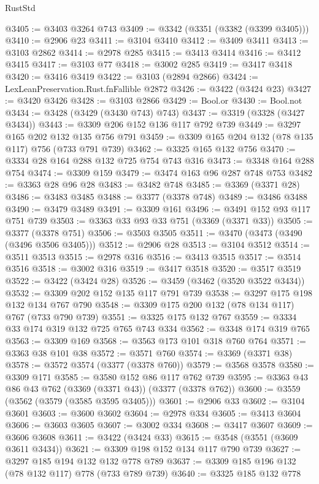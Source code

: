 \begin{lexlean}{RustStd}
\begin{coremodule}
@3405 := @3403 @3264 @743
@3409 := @3342 (@3351 (@3382 (@3399 @3405)))
@3410 := @2906 @23
@3411 := @3104 @3410
@3412 := @3409 @3411
@3413 := @3103 @2862
@3414 := @2978 @285
@3415 := @3413 @3414
@3416 := @3412 @3415
@3417 := @3103 @77
@3418 := @3002 @285
@3419 := @3417 @3418
@3420 := @3416 @3419
@3422 := @3103 (@2894 @2866)
@3424 := LexLeanPreservation.Rust.fnFallible @2872
@3426 := @3422 (@3424 @23)
@3427 := @3420 @3426
@3428 := @3103 @2866
@3429 := Bool.or
@3430 := Bool.not
@3434 := @3428 (@3429 (@3430 @743) @743)
@3437 := @3319 (@3328 (@3427 @3434))
@3443 := @3309 @206 @152 @136 @117 @792 @739
@3449 := @3297 @165 @202 @132 @135 @756 @791
@3459 := @3309 @165 @204 @132 (@78 @135 @117) @756 (@733 @791 @739)
@3462 := @3325 @165 @132 @756
@3470 := @3334 @28 @164 @288 @132 @725 @754 @743 @316
@3473 := @3348 @164 @288 @754
@3474 := @3309 @159
@3479 := @3474 @163 @96 @287 @748 @753
@3482 := @3363 @28 @96 @28
@3483 := @3482 @748
@3485 := @3369 (@3371 @28)
@3486 := @3483 @3485
@3488 := @3377 (@3378 @748)
@3489 := @3486 @3488
@3490 := @3479 @3489
@3491 := @3309 @161
@3496 := @3491 @152 @93 @117 @751 @739
@3503 := @3363 @33 @93 @33 @751 (@3369 (@3371 @33))
@3505 := @3377 (@3378 @751)
@3506 := @3503 @3505
@3511 := @3470 (@3473 (@3490 (@3496 @3506 @3405)))
@3512 := @2906 @28
@3513 := @3104 @3512
@3514 := @3511 @3513
@3515 := @2978 @316
@3516 := @3413 @3515
@3517 := @3514 @3516
@3518 := @3002 @316
@3519 := @3417 @3518
@3520 := @3517 @3519
@3522 := @3422 (@3424 @28)
@3526 := @3459 (@3462 (@3520 @3522 @3434))
@3532 := @3309 @202 @152 @135 @117 @791 @739
@3538 := @3297 @175 @198 @132 @134 @767 @790
@3548 := @3309 @175 @200 @132 (@78 @134 @117) @767 (@733 @790 @739)
@3551 := @3325 @175 @132 @767
@3559 := @3334 @33 @174 @319 @132 @725 @765 @743 @334
@3562 := @3348 @174 @319 @765
@3563 := @3309 @169
@3568 := @3563 @173 @101 @318 @760 @764
@3571 := @3363 @38 @101 @38
@3572 := @3571 @760
@3574 := @3369 (@3371 @38)
@3578 := @3572 @3574 (@3377 (@3378 @760))
@3579 := @3568 @3578
@3580 := @3309 @171
@3585 := @3580 @152 @86 @117 @762 @739
@3595 := @3363 @43 @86 @43 @762 (@3369 (@3371 @43)) (@3377 (@3378 @762))
@3600 := @3559 (@3562 (@3579 (@3585 @3595 @3405)))
@3601 := @2906 @33
@3602 := @3104 @3601
@3603 := @3600 @3602
@3604 := @2978 @334
@3605 := @3413 @3604
@3606 := @3603 @3605
@3607 := @3002 @334
@3608 := @3417 @3607
@3609 := @3606 @3608
@3611 := @3422 (@3424 @33)
@3615 := @3548 (@3551 (@3609 @3611 @3434))
@3621 := @3309 @198 @152 @134 @117 @790 @739
@3627 := @3297 @185 @194 @132 @132 @778 @789
@3637 := @3309 @185 @196 @132 (@78 @132 @117) @778 (@733 @789 @739)
@3640 := @3325 @185 @132 @778

\end{coremodule}
\end{lexlean}
